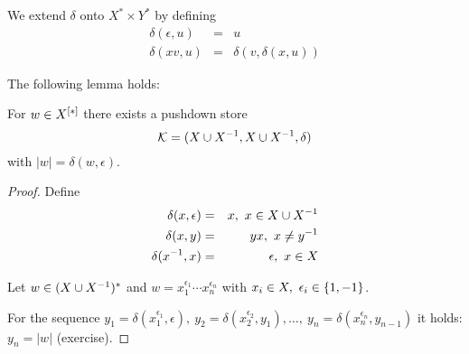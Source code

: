 We extend $\delta$ onto $X^* \times Y^*$ by defining
\begin{eqnarray*}
\delta(\epsilon, u) & = & u \\
\delta(x v, u) & = & \delta(v,  \delta(x,u))
\end{eqnarray*}

The following lemma holds:
\begin{lemma}
For $w \in \mbox{${X}^{[*]}$}$ there exists a pushdown store
\[ \mbox{$\mathcal{K}$} =(X \cup {X}^{-1}, X \cup {X}^{-1}, \delta) \]
with $|w| = \delta(w, \epsilon)$.
\end{lemma}

\begin{proof}
Define
\begin{eqnarray}
\delta(x, \epsilon) & = & x,\ x\in X \cup {X}^{-1} \label{delta:1} \\
\delta(x, y) & = & yx,\ x\neq y^{-1} \label{delta:2}\\
\delta(x^{-1}, x) & = & \epsilon,\ x\in X \label{delta:3}
\end{eqnarray}

Let $w\in (X \cup {X}^{-1})^*$ and $w = x_1^{\epsilon_1} \cdots x_n^{\epsilon_n}$
with $x_i\in X,\ \epsilon_i\in \mbox{$\{1, -1\}$}$.

For the sequence $y_1 = \delta(x_1^{\epsilon_1}, \epsilon),\ y_2 =
\delta(x_2^{\epsilon_2}, y_1), \ldots,\ y_n = \delta(x_n^{\epsilon_n}, y_{n-1})$
it holds: $y_n = |w|$ (exercise).
\end{proof}


